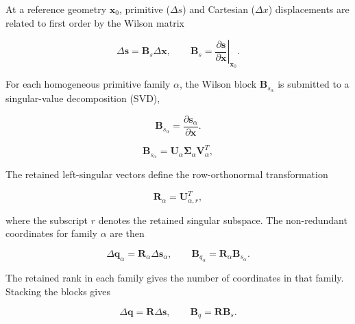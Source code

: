 \documentclass[aip,jcp,reprint,longbibliography,floatfix]{revtex4-2}
\begin{document}
At a reference geometry $\mathbf{x}_0$, primitive ($\Delta s$) and Cartesian
($\Delta x$) displacements are related to first order by the Wilson matrix\cite{Wilson1955}

\begin{equation}
\Delta \mathbf{s}
=
\mathbf{B}_s
\Delta \mathbf{x},
\qquad
\mathbf{B}_s =
\left.
\frac{\partial \mathbf{s}}
{\partial \mathbf{x}}
\right|_{\mathbf{x}_0}.
\end{equation}

For each homogeneous primitive family $\alpha$, the Wilson block
$\mathbf{B}_{s_\alpha}$ is submitted to a singular-value
decomposition (SVD),\cite{GolubReinsch1970}

\begin{equation}
\mathbf{B}_{s_\alpha}
=
\frac{\partial\mathbf{s}_\alpha}
{\partial\mathbf{x}} .
\end{equation}

\begin{equation}
\mathbf{B}_{s_\alpha}
=
\mathbf{U}_{\alpha}
\boldsymbol{\Sigma}_{\alpha}
\mathbf{V}_{\alpha}^{T},
\end{equation}

The retained left-singular vectors define the row-orthonormal transformation

\begin{equation}
\mathbf{R}_{\alpha}
=
\mathbf{U}_{\alpha,r}^{T},
\end{equation}

where the subscript $r$ denotes the retained singular subspace. The
non-redundant coordinates for family $\alpha$ are then

\begin{equation}
\Delta \mathbf{q}_\alpha
=
\mathbf{R}_\alpha
\Delta \mathbf{s}_\alpha ,
\qquad
\mathbf{B}_{q_\alpha}
=
\mathbf{R}_\alpha
\mathbf{B}_{s_\alpha}.
\end{equation}

The retained rank in each family gives the number of coordinates in that
family. Stacking the blocks gives

\begin{equation}
\Delta \mathbf{q}
=
\mathbf{R}
\Delta \mathbf{s},
\qquad
\mathbf{B}_{q}
=
\mathbf{R}
\mathbf{B}_s .
\end{equation}
\end{document}
